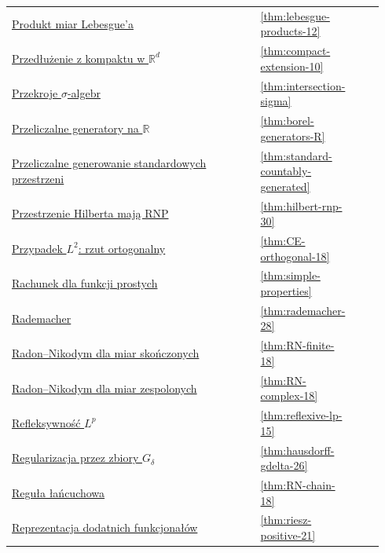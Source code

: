 \documentclass[11pt,a4paper,oneside]{book}
\numberwithin{equation}{chapter}
\theoremstyle{plain}
\theoremstyle{definition}
\theoremstyle{remark}
\begin{document}
\begin{longtable}{@{}p{0.72\linewidth}p{0.135\linewidth}p{0.08\linewidth}@{}}
\hyperref[thm:lebesgue-products-12]{Produkt miar Lebesgue'a} & \ref*{thm:lebesgue-products-12} & \pageref*{thm:lebesgue-products-12} \\
\hyperref[thm:compact-extension-10]{Przedłużenie z kompaktu w $\mathbb R^d$} & \ref*{thm:compact-extension-10} & \pageref*{thm:compact-extension-10} \\
\hyperref[thm:intersection-sigma]{Przekroje $\sigma$-algebr} & \ref*{thm:intersection-sigma} & \pageref*{thm:intersection-sigma} \\
\hyperref[thm:borel-generators-R]{Przeliczalne generatory na $\mathbb R$} & \ref*{thm:borel-generators-R} & \pageref*{thm:borel-generators-R} \\
\hyperref[thm:standard-countably-generated]{Przeliczalne generowanie standardowych przestrzeni} & \ref*{thm:standard-countably-generated} & \pageref*{thm:standard-countably-generated} \\
\hyperref[thm:hilbert-rnp-30]{Przestrzenie Hilberta mają RNP} & \ref*{thm:hilbert-rnp-30} & \pageref*{thm:hilbert-rnp-30} \\
\hyperref[thm:CE-orthogonal-18]{Przypadek $L^2$: rzut ortogonalny} & \ref*{thm:CE-orthogonal-18} & \pageref*{thm:CE-orthogonal-18} \\
\hyperref[thm:simple-properties]{Rachunek dla funkcji prostych} & \ref*{thm:simple-properties} & \pageref*{thm:simple-properties} \\
\hyperref[thm:rademacher-28]{Rademacher} & \ref*{thm:rademacher-28} & \pageref*{thm:rademacher-28} \\
\hyperref[thm:RN-finite-18]{Radon--Nikodym dla miar skończonych} & \ref*{thm:RN-finite-18} & \pageref*{thm:RN-finite-18} \\
\hyperref[thm:RN-complex-18]{Radon--Nikodym dla miar zespolonych} & \ref*{thm:RN-complex-18} & \pageref*{thm:RN-complex-18} \\
\hyperref[thm:reflexive-lp-15]{Refleksywność $L^p$} & \ref*{thm:reflexive-lp-15} & \pageref*{thm:reflexive-lp-15} \\
\hyperref[thm:hausdorff-gdelta-26]{Regularizacja przez zbiory $G_\delta$} & \ref*{thm:hausdorff-gdelta-26} & \pageref*{thm:hausdorff-gdelta-26} \\
\hyperref[thm:RN-chain-18]{Reguła łańcuchowa} & \ref*{thm:RN-chain-18} & \pageref*{thm:RN-chain-18} \\
\hyperref[thm:riesz-positive-21]{Reprezentacja dodatnich funkcjonałów} & \ref*{thm:riesz-positive-21} & \pageref*{thm:riesz-positive-21} \\

\end{longtable}
\end{document}

